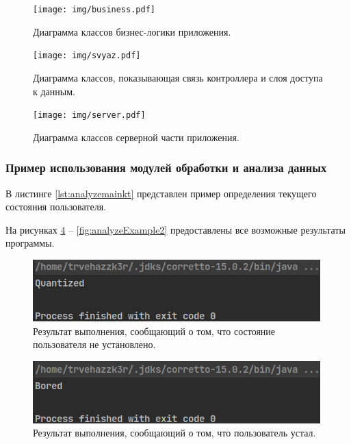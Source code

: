 \begin{figure}[H]
	\centering
	\texttt{[image: img/business.pdf]}
	\caption{Диаграмма классов бизнес-логики приложения.}
	\label{fig:business}
\end{figure}

\begin{figure}[H]
	\centering
	\texttt{[image: img/svyaz.pdf]}
	\caption{Диаграмма классов, показывающая связь контроллера и слоя доступа к данным.}
	\label{fig:svyaz}
\end{figure}

\begin{figure}[H]
	\centering
	\texttt{[image: img/server.pdf]}
	\caption{Диаграмма классов серверной части приложения.}
	\label{fig:server}
\end{figure}

\subsubsection{Пример использования модулей обработки и анализа данных}

В листинге \ref{lst:analyzemainkt} представлен пример определения текущего состояния пользователя.

На рисунках \ref{fig:analyzeExample0} -- \ref{fig:analyzeExample2} предоставлены все возможные результаты программы.

\begin{figure}[H]
	\centering
	\includegraphics[width=\textwidth]{img/analyzeExample0.png}
	\caption{Результат выполнения, сообщающий о том, что состояние пользователя не установлено.}
	\label{fig:analyzeExample0}
\end{figure}

\begin{figure}[H]
	\centering
	\includegraphics[width=\textwidth]{img/analyzeExample1.png}
	\caption{Результат выполнения, сообщающий о том, что пользователь устал.}
	\label{fig:analyzeExample1}
\end{figure}

